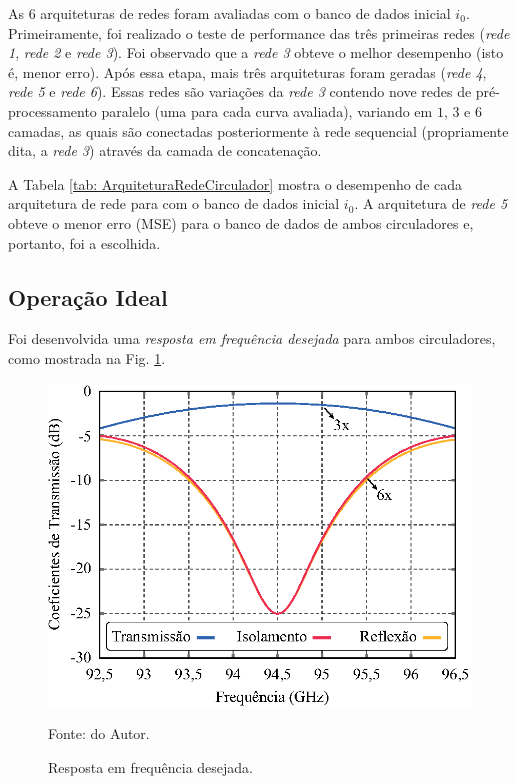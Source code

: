 As 6 arquiteturas de redes foram avaliadas com o banco de dados inicial $i_{0}$. Primeiramente, foi realizado o teste de performance das três primeiras redes (\textit{rede 1}, \textit{rede 2} e \textit{rede 3}). Foi observado que a \textit{rede 3} obteve o melhor desempenho (isto é, menor erro). Após essa etapa, mais três arquiteturas foram geradas (\textit{rede 4}, \textit{rede 5} e \textit{rede 6}). Essas redes são variações da \textit{rede 3} contendo nove redes de pré-processamento paralelo (uma para cada curva avaliada), variando em $1$, $3$ e $6$ camadas, as quais são conectadas posteriormente à rede sequencial (propriamente dita, a \textit{rede 3}) através da camada de concatenação.



A Tabela \ref{tab: ArquiteturaRedeCirculador} mostra o desempenho de cada arquitetura de rede para com o banco de dados inicial $i_{0}$. A arquitetura de \textit{rede 5} obteve o menor erro (MSE) para o banco de dados de ambos circuladores e, portanto, foi a escolhida.

\subsection{Operação Ideal}

Foi desenvolvida uma \textit{resposta em frequência desejada} para ambos circuladores, como mostrada na Fig. \ref{fig: PhcTargetFrequencyResponse}.

\begin{figure}[H]
	\centering\includegraphics{04-Figuras/PhcTargetFrequencyResponse.eps}
	\caption{Resposta em frequência desejada.} \par
    Fonte: do Autor.
	\label{fig: PhcTargetFrequencyResponse}
\end{figure}

